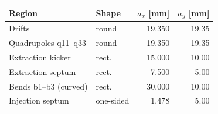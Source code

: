 \begin{tabular}{llrr}\toprule
Region & Shape & $a_x$ [mm] & $a_y$ [mm] \\\midrule
Drifts & round & 19.350 & 19.35 \\
Quadrupoles q11--q33 & round & 19.350 & 19.35 \\
Extraction kicker & rect. & 15.000 & 10.00 \\
Extraction septum & rect. & 7.500 & 5.00 \\
Bends b1--b3 (curved) & rect. & 30.000 & 10.00 \\
Injection septum & one-sided & 1.478 & 5.00 \\
\bottomrule\end{tabular}
